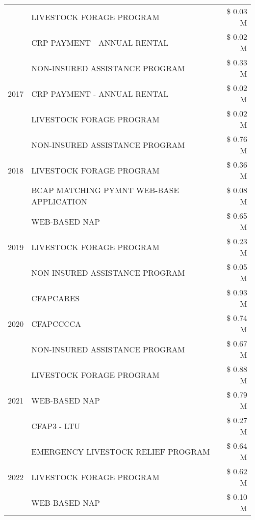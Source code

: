 \begin{tabular}{llr}
 & LIVESTOCK FORAGE PROGRAM & \$ 0.03 M \\
 & CRP PAYMENT - ANNUAL RENTAL & \$ 0.02 M \\
\cline{1-3}
\multirow[t]{3}{*}{2017} & NON-INSURED ASSISTANCE PROGRAM & \$ 0.33 M \\
 & CRP PAYMENT - ANNUAL RENTAL & \$ 0.02 M \\
 & LIVESTOCK FORAGE PROGRAM & \$ 0.02 M \\
\cline{1-3}
\multirow[t]{3}{*}{2018} & NON-INSURED ASSISTANCE PROGRAM & \$ 0.76 M \\
 & LIVESTOCK FORAGE PROGRAM & \$ 0.36 M \\
 & BCAP MATCHING PYMNT WEB-BASE APPLICATION & \$ 0.08 M \\
\cline{1-3}
\multirow[t]{3}{*}{2019} & WEB-BASED NAP & \$ 0.65 M \\
 & LIVESTOCK FORAGE PROGRAM & \$ 0.23 M \\
 & NON-INSURED ASSISTANCE PROGRAM & \$ 0.05 M \\
\cline{1-3}
\multirow[t]{3}{*}{2020} & CFAPCARES & \$ 0.93 M \\
 & CFAPCCCCA & \$ 0.74 M \\
 & NON-INSURED ASSISTANCE PROGRAM & \$ 0.67 M \\
\cline{1-3}
\multirow[t]{3}{*}{2021} & LIVESTOCK FORAGE PROGRAM & \$ 0.88 M \\
 & WEB-BASED NAP & \$ 0.79 M \\
 & CFAP3 - LTU & \$ 0.27 M \\
\cline{1-3}
\multirow[t]{3}{*}{2022} & EMERGENCY LIVESTOCK RELIEF PROGRAM & \$ 0.64 M \\
 & LIVESTOCK FORAGE PROGRAM & \$ 0.62 M \\
 & WEB-BASED NAP & \$ 0.10 M \\
\cline{1-3}
\bottomrule
\end{tabular}
